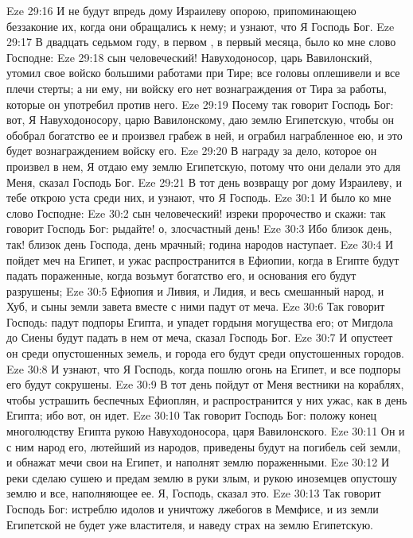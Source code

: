 \vs Eze 29:16 И не будут впредь дому Израилеву опорою, припоминающею беззаконие их, когда они обращались к нему; и узнают, что Я Господь Бог.
\rsbpar\vs Eze 29:17 В двадцать седьмом году, в первом , в первый  месяца, было ко мне слово Господне:
\vs Eze 29:18 сын человеческий! Навуходоносор, царь Вавилонский, утомил свое войско большими работами при Тире; все головы оплешивели и все плечи стерты; а ни ему, ни войску его нет вознаграждения от Тира за работы, которые он употребил против него.
\vs Eze 29:19 Посему так говорит Господь Бог: вот, Я Навуходоносору, царю Вавилонскому, даю землю Египетскую, чтобы он обобрал богатство ее и произвел грабеж в ней, и ограбил награбленное ею, и это будет вознаграждением войску его.
\vs Eze 29:20 В награду за дело, которое он произвел в нем, Я отдаю ему землю Египетскую, потому что они делали это для Меня, сказал Господь Бог.
\vs Eze 29:21 В тот день возвращу рог дому Израилеву, и тебе открою уста среди них, и узнают, что Я Господь.
\vs Eze 30:1 И было ко мне слово Господне:
\vs Eze 30:2 сын человеческий! изреки пророчество и скажи: так говорит Господь Бог: рыдайте! о, злосчастный день!
\vs Eze 30:3 Ибо близок день, так! близок день Господа, день мрачный; година народов наступает.
\vs Eze 30:4 И пойдет меч на Египет, и ужас распространится в Ефиопии, когда в Египте будут падать пораженные, когда возьмут богатство его, и основания его будут разрушены;
\vs Eze 30:5 Ефиопия и Ливия, и Лидия, и весь смешанный народ, и Хуб, и сыны земли завета вместе с ними падут от меча.
\vs Eze 30:6 Так говорит Господь: падут подпоры Египта, и упадет гордыня могущества его; от Мигдола до Сиены будут падать в нем от меча, сказал Господь Бог.
\vs Eze 30:7 И опустеет он среди опустошенных земель, и города его будут среди опустошенных городов.
\vs Eze 30:8 И узнают, что Я Господь, когда пошлю огонь на Египет, и все подпоры его будут сокрушены.
\vs Eze 30:9 В тот день пойдут от Меня вестники на кораблях, чтобы устрашить беспечных Ефиоплян, и распространится у них ужас, как в день Египта; ибо вот, он идет.
\vs Eze 30:10 Так говорит Господь Бог: положу конец многолюдству Египта рукою Навуходоносора, царя Вавилонского.
\vs Eze 30:11 Он и с ним народ его, лютейший из народов, приведены будут на погибель сей земли, и обнажат мечи свои на Египет, и наполнят землю пораженными.
\vs Eze 30:12 И реки сделаю сушею и предам землю в руки злым, и рукою иноземцев опустошу землю и все, наполняющее ее. Я, Господь, сказал это.
\vs Eze 30:13 Так говорит Господь Бог: истреблю идолов и уничтожу лжебогов в Мемфисе, и из земли Египетской не будет уже властителя, и наведу страх на землю Египетскую.
